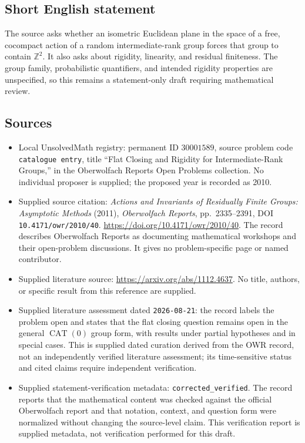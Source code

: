 \documentclass[11pt]{article}
\newcommand{\Z}{\mathbb{Z}}
\begin{document}
\subsection{Short English statement}
The source asks whether an isometric Euclidean plane in the space of a free, cocompact action of a random intermediate-rank group forces that group to contain \(\Z^2\). It also asks about rigidity, linearity, and residual finiteness. The group family, probabilistic quantifiers, and intended rigidity properties are unspecified, so this remains a statement-only draft requiring mathematical review.
\subsection{Sources}
\begin{itemize}
\item Local UnsolvedMath registry: permanent ID \(30001589\), source problem code \texttt{catalogue entry}, title ``Flat Closing and Rigidity for Intermediate-Rank Groups,'' in the Oberwolfach Reports Open Problems collection. No individual proposer is supplied; the proposed year is recorded as 2010.
\item Supplied source citation: \emph{Actions and Invariants of Residually Finite Groups: Asymptotic Methods} (2011), \emph{Oberwolfach Reports}, pp.~2335--2391, DOI \texttt{10.4171/owr/2010/40}. \url{https://doi.org/10.4171/owr/2010/40}. The record describes Oberwolfach Reports as documenting mathematical workshops and their open-problem discussions. It gives no problem-specific page or named contributor.
\item Supplied literature source: \url{https://arxiv.org/abs/1112.4637}. No title, authors, or specific result from this reference are supplied.
\item Supplied literature assessment dated \texttt{2026-08-21}: the record labels the problem open and states that the flat closing question remains open in the general \(\operatorname{CAT}(0)\) group form, with results under partial hypotheses and in special cases. This is supplied dated curation derived from the OWR record, not an independently verified literature assessment; its time-sensitive status and cited claims require independent verification.
\item Supplied statement-verification metadata: \texttt{corrected\_verified}. The record reports that the mathematical content was checked against the official Oberwolfach report and that notation, context, and question form were normalized without changing the source-level claim. This verification report is supplied metadata, not verification performed for this draft.
\end{itemize}
\end{document}

